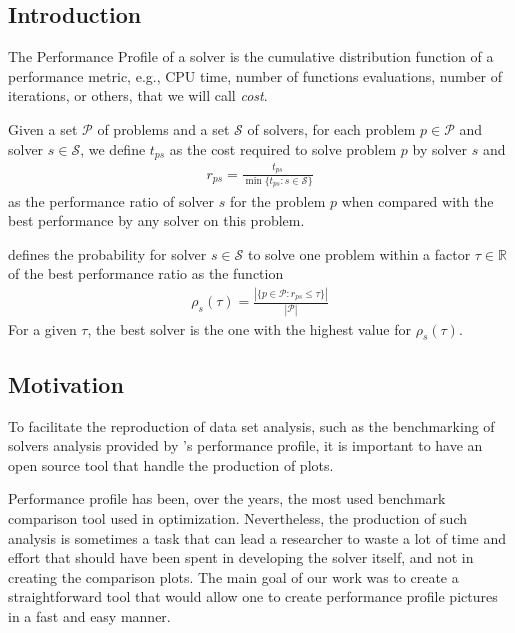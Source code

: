 \documentclass[10pt,a4paper]{article}
\def\Pset{\mathcal{P}}
\def\Sset{\mathcal{S}}
\begin{document}
\subsection*{Introduction}

    The Performance Profile of a solver is the cumulative distribution
    function of a performance metric, e.g., CPU time, number of functions
    evaluations, number of iterations, or others, that we will call \emph{cost}.

    Given a set $\Pset$ of problems and a set $\Sset$ of solvers, for each problem $p
    \in \Pset$ and solver $s \in \Sset$, we define $t_{ps}$ as the cost
    required to solve problem $p$ by solver $s$ and
    \begin{align*}
      r_{ps} = \frac{t_{ps}}{\min\{t_{ps}: s \in \Sset\}}
    \end{align*}
    as the performance ratio of solver $s$ for the problem $p$ when compared
    with the best performance by any solver on this problem.

    \textcite{Dolan:2002du} defines the probability for solver $s \in \Sset$ to
    solve one problem within a factor $\tau \in \mathds{R}$ of the best
    performance ratio as the function
    \begin{align*}
      \rho_s(\tau) = \frac{| \{p \in \Pset: r_{ps} \leq \tau\} |}{| \Pset |}
    \end{align*}
    For a given $\tau$, the best solver is the one with the highest value for
    $\rho_s(\tau)$.

\subsection*{Motivation}

    To facilitate the reproduction of data set analysis, such as the
    benchmarking of solvers analysis provided by \citeauthor{Dolan:2002du}'s
    performance profile, it is important to have an open source tool that handle
    the production of plots.

    Performance profile has been, over the years, the most used benchmark
    comparison tool used in optimization. Nevertheless, the production of such
    analysis is sometimes a task that can lead a researcher to waste a lot of
    time and effort that should have been spent in developing the solver itself,
    and not in creating the comparison plots. The main goal of our work was to
    create  a straightforward  tool that would allow one to create performance
    profile pictures in a fast and easy manner.
\end{document}
